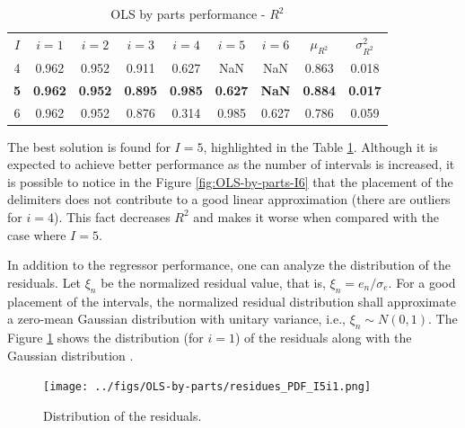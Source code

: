 \documentclass[english]{sobraep}
\begin{document}
\begin{table}[H]
	\centering
	\caption{OLS by parts performance - \(R^2\)}
	\footnotesize
	\setlength{\tabcolsep}{5pt}
	\begin{tabular}{ccccccccc}
		\hline
		\multirow{2}{*}{\(I\)} & \multirow{2}{*}{\(i=1\)} & \multirow{2}{*}{\(i=2\)} & \multirow{2}{*}{\(i=3\)} & \multirow{2}{*}{\(i=4\)} & \multirow{2}{*}{\(i=5\)} & \multirow{2}{*}{\(i=6\)} & \multirow{2}{*}{\(\mu_{R^2}\)} & \multirow{2}{*}{\(\sigma_{R^2}^2\)} \\
		&  &  & \\		
		\hline
		4 & 0.962 & 0.952 & 0.911 & 0.627 & NaN & NaN & 0.863 & 0.018 \\
        \hline
		\textbf{5} &  \textbf{0.962}  & \textbf{0.952} & \textbf{0.895} & \textbf{0.985} & \textbf{0.627} & \textbf{NaN} & \textbf{0.884} & \textbf{0.017} \\
		\hline
		6 & 0.962 & 0.952 & 0.876 & 0.314 & 0.985 & 0.627 & 0.786 & 0.059 \\
		\hline
	\end{tabular} \label{tab:OLS-performance}
\end{table}

The best solution is found for \(I=5\), highlighted in the Table \ref{tab:OLS-performance}. Although it is expected to achieve better performance as the number of intervals is increased, it is possible to notice in the Figure \ref{fig:OLS-by-parts-I6} that the placement of the delimiters does not contribute to a good linear approximation (there are outliers for \(i=4\)). This fact decreases \(R^2\) and makes it worse when compared with the case where \(I=5\).

In addition to the regressor performance, one can analyze the distribution of the residuals. Let \(\xi_n\) be the normalized residual value, that is, \(\xi_n = e_n/\sigma_e\). For a good placement of the intervals, the normalized residual distribution shall approximate a zero-mean Gaussian distribution with unitary variance, i.e., \(\xi_n \sim N(0, 1)\). The Figure \ref{fig:distribution} shows the distribution (for \(i=1\)) of the residuals along with the Gaussian distribution \cite{leon1994probability}.

\begin{figure}[H]
    \centering
    \texttt{[image: ../figs/OLS-by-parts/residues\_PDF\_I5i1.png]}
    \caption{Distribution of the residuals.}
    \label{fig:distribution}
\end{figure}
\end{document}

